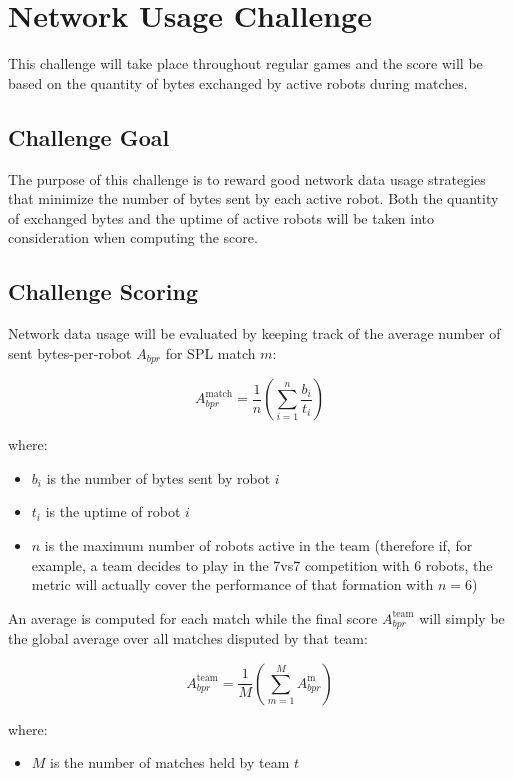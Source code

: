 \section{Network Usage Challenge} %
This challenge will take place throughout regular games and the score will be based on the quantity of bytes exchanged by active robots during matches. 


\subsection{Challenge Goal}
The purpose of this challenge is to reward good network data usage strategies that minimize the number of bytes sent by each active robot. Both the quantity of exchanged bytes and the uptime of active robots will be taken into consideration when computing the score.

\subsection{Challenge Scoring}
Network data usage will be evaluated by keeping track of the average number of sent bytes-per-robot $A_{bpr}$ for SPL match $m$:

$$ A_{bpr}^\text{match} = \frac{1}{n} \left( \sum_{i=1}^n \frac{b_i}{t_i} \right) $$

where:
\begin{itemize}
    \item $b_i$ is the number of bytes sent by robot $i$
    \item $t_i$ is the uptime of robot $i$
    \item $n$ is the maximum number of robots active in the team (therefore if, for example, a team decides to play in the 7vs7 competition with 6 robots, the metric will actually cover the performance of that formation with $n=6$)
\end{itemize}

An average is computed for each match while the final score $A_{bpr}^\text{team}$ will simply be the global average over all matches disputed by that team:

$$ A_{bpr}^\text{team} = \frac{1}{M} \left( \sum_{m=1}^M A_{bpr}^\text{m} \right) $$

where:
\begin{itemize}
    \item $M$ is the number of matches held by team $t$
\end{itemize}

